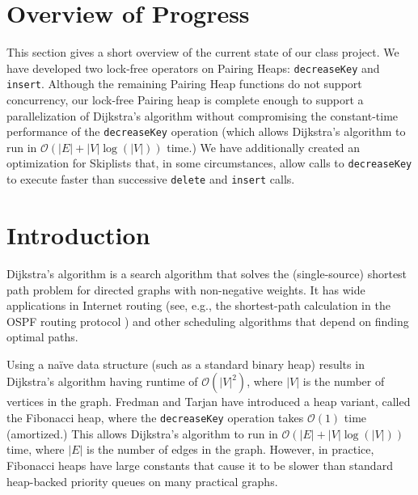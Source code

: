 \documentclass{acm_proc_article-sp}
\begin{document}
\section{Overview of Progress}
This section gives a short overview of the current
state of our class project. We have developed two
lock-free operators on Pairing Heaps: \texttt{decreaseKey}
and \texttt{insert}. Although the remaining Pairing Heap functions
do not support concurrency, our lock-free Pairing heap is complete
enough to support a parallelization of Dijkstra's algorithm
without compromising the constant-time performance of the 
\texttt{decreaseKey}
operation (which allows Dijkstra's algorithm to run
in $\mathcal{O}(|E| + |V|\log(|V|))$ time.)
We have additionally created an optimization for Skiplists that,
in some circumstances, allow calls to \texttt{decreaseKey} to
execute faster than successive \texttt{delete} and \texttt{insert}
calls.

\section{Introduction}
Dijkstra's algorithm \cite{dijkstra59} is a search
algorithm that solves the (single-source) shortest
path problem for directed graphs with non-negative
weights. It has wide applications in Internet routing
(see, e.g., the shortest-path calculation in the OSPF
routing protocol \cite{rfc5340}) and other scheduling
algorithms that depend on finding optimal paths.

Using a na\"{i}ve data structure (such as a standard binary heap)
results in Dijkstra's algorithm having runtime of $\mathcal{O}(|V|^2)$, where $|V|$
is the number of vertices in the graph. Fredman and Tarjan have
introduced \cite{fredman87} a heap variant, called the Fibonacci heap,
where the \texttt{decreaseKey} operation takes $\mathcal{O}(1)$ time
(amortized.) This allows Dijkstra's algorithm to run in $\mathcal{O}(|E| + |V|\log(|V|))$
time, where $|E|$ is the number of edges in the graph.
However, in practice, Fibonacci heaps have large constants that
cause it to be slower than standard heap-backed priority queues
on many practical graphs.
\end{document}
